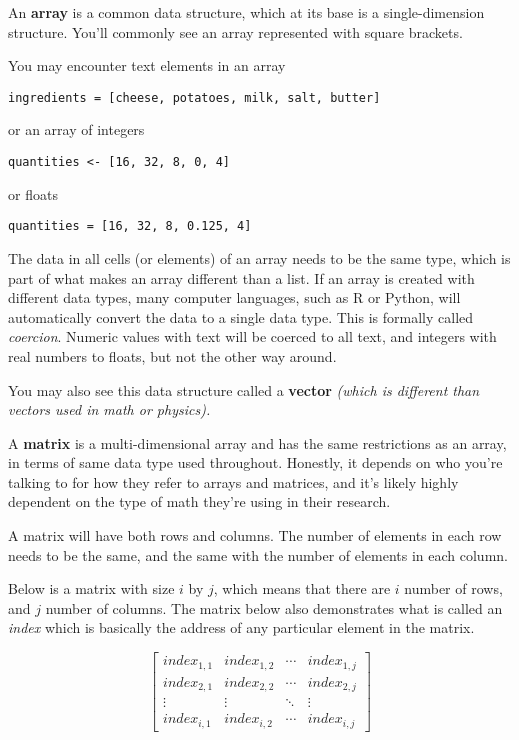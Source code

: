 \documentclass[
]{book}
\begin{document}
An \textbf{array} is a common data structure, which at its base is a single-dimension structure. You'll commonly see an array represented with square brackets.

You may encounter text elements in an array

\texttt{ingredients\ =\ {[}cheese,\ potatoes,\ milk,\ salt,\ butter{]}}

or an array of integers

\texttt{quantities\ \textless{}-\ {[}16,\ 32,\ 8,\ 0,\ 4{]}}

or floats

\texttt{quantities\ =\ {[}16,\ 32,\ 8,\ 0.125,\ 4{]}}

The data in all cells (or elements) of an array needs to be the same type, which is part of what makes an array different than a list. If an array is created with different data types, many computer languages, such as R or Python, will automatically convert the data to a single data type. This is formally called \emph{coercion}. Numeric values with text will be coerced to all text, and integers with real numbers to floats, but not the other way around.

You may also see this data structure called a \textbf{vector} \emph{(which is different than vectors used in math or physics).}

A \textbf{matrix} is a multi-dimensional array and has the same restrictions as an array, in terms of same data type used throughout. Honestly, it depends on who you're talking to for how they refer to arrays and matrices, and it's likely highly dependent on the type of math they're using in their research.

A matrix will have both rows and columns. The number of elements in each row needs to be the same, and the same with the number of elements in each column.

Below is a matrix with size \(i\) by \(j\), which means that there are \(i\) number of rows, and \(j\) number of columns. The matrix below also demonstrates what is called an \emph{index} which is basically the address of any particular element in the matrix.

\begin{equation}
\begin{bmatrix}
  index_{1,1} & index_{1,2} & \cdots & index_{1,j} \\
  index_{2,1} & index_{2,2} & \cdots & index_{2,j} \\
  \vdots  & \vdots  & \ddots & \vdots  \\
  index_{i,1} & index_{i,2} & \cdots & index_{i,j} 
\end{bmatrix}
\end{equation}
\end{document}
